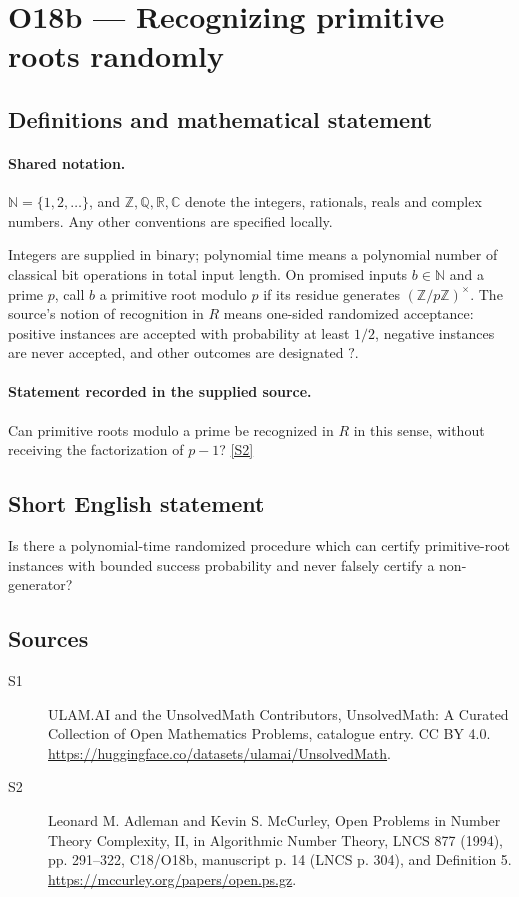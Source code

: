\documentclass[11pt]{article}
\newcommand{\sref}[2]{\hyperlink{source:#1:#2}{[S#2]}}
\begin{document}
\section{O18b — Recognizing primitive roots randomly}\label{statement}

\subsection{Definitions and mathematical statement}

\paragraph{Shared notation.}$\mathbb N=\{1,2,\ldots\}$, and $\mathbb Z,\mathbb Q,\mathbb R,\mathbb C$ denote the integers, rationals, reals and complex numbers. Any other conventions are specified locally.


Integers are supplied in binary; polynomial time means a polynomial number of classical bit operations in total input length. On promised inputs $b\in\mathbb N$ and a prime $p$, call $b$ a primitive root modulo $p$ if its residue generates $(\mathbb Z/p\mathbb Z)^\times$. The source's notion of recognition in $R$ means one-sided randomized acceptance: positive instances are accepted with probability at least $1/2$, negative instances are never accepted, and other outcomes are designated $?$.
\paragraph{Statement recorded in the supplied source.}
Can primitive roots modulo a prime be recognized in $R$ in this sense, without receiving the factorization of $p-1$? \sref{statement}{2}
\subsection{Short English statement}
Is there a polynomial-time randomized procedure which can certify primitive-root instances with bounded success probability and never falsely certify a non-generator?
\subsection{Sources}
\begin{description}
\item[\hypertarget{source:statement:1}{S1}] ULAM.AI and the UnsolvedMath Contributors, UnsolvedMath: A Curated Collection of Open Mathematics Problems, catalogue entry. CC BY 4.0. \url{https://huggingface.co/datasets/ulamai/UnsolvedMath}.
\item[\hypertarget{source:statement:2}{S2}] Leonard M. Adleman and Kevin S. McCurley, Open Problems in Number Theory Complexity, II, in Algorithmic Number Theory, LNCS 877 (1994), pp. 291--322, C18/O18b, manuscript p. 14 (LNCS p. 304), and Definition 5. \url{https://mccurley.org/papers/open.ps.gz}.
\end{description}
\label{end:statement}
\end{document}
